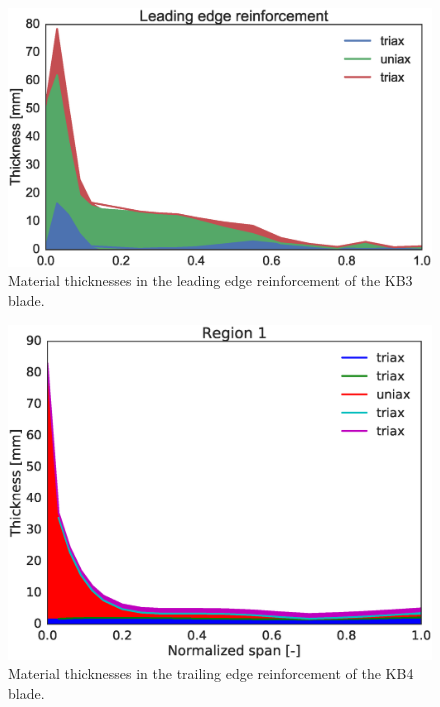 \begin{figure}[!ht]
\begin{center}
	\includegraphics[width=.85\linewidth]{figures/KB3_region07.eps}
\end{center}
\caption{Material thicknesses in the leading edge reinforcement of the KB3 blade.}
\label{fig:KB3matstackr07}
\end{figure}
\begin{figure}[!ht]
\begin{center}
	\includegraphics[width=.85\linewidth]{figures/KB4_laminate_layers_r01.eps}
\end{center}
\caption{Material thicknesses in the trailing edge reinforcement of the KB4 blade.}
\label{fig:KB4matstackr01}
\end{figure}

